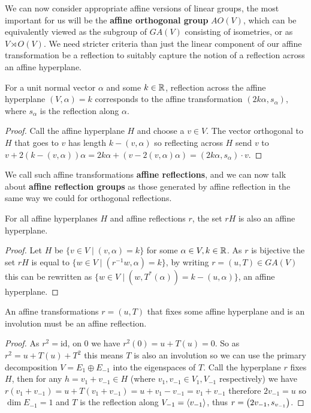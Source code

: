 \documentclass[../main.tex]{subfiles}
\begin{document}
We can now consider appropriate affine versions of linear groups, the most important for us will be the \textbf{affine orthogonal group} $AO(V)$, which can be equivalently viewed as the subgroup of $GA(V)$ consisting of isometries, or as $V\rtimes O(V)$. We need stricter criteria than just the linear component of our affine transformation be a reflection to suitably capture the notion of a reflection across an affine hyperplane.

\begin{proposition}
    For a unit normal vector $\alpha$ and some $k\in \mathbb{R}$, reflection across the affine hyperplane $(V,\alpha) = k$ corresponds to the affine transformation $(2k\alpha,s_\alpha)$, where $s_\alpha$ is the reflection along $\alpha$.\begin{proof}
        Call the affine hyperplane $H$ and choose a $v\in V$. The vector orthogonal to $H$ that goes to $v$ has length $k-(v,\alpha)$ so reflecting across $H$ send $v$ to $v+2(k-(v,\alpha))\alpha = 2k\alpha + (v-2(v,\alpha)\alpha) = (2k\alpha, s_\alpha)\cdot v$.
    \end{proof}
\end{proposition}

We call such affine transformations \textbf{affine reflections}, and we can now talk about \textbf{affine reflection groups} as those generated by affine reflection in the same way we could for orthogonal reflections.

\begin{lemma}
    For all affine hyperplanes $H$ and affine reflections $r$, the set $rH$ is also an affine hyperplane.
    \begin{proof}
        Let $H$ be $\{v\in V \mid (v,\alpha)=k\}$ for some $\alpha\in V, k\in\mathbb{R}$. As $r$ is bijective the set $rH$ is equal to $\{w\in V \mid (r^{-1}w,\alpha) = k\}$, by writing $r=(u,T)\in GA(V)$ this can be rewritten as $\{w\in V\mid (w,T^*(\alpha))=k-(u,\alpha)\}$, an affine hyperplane.
    \end{proof}
\end{lemma}

\begin{lemma}
    An affine transformations $r=(u,T)$ that fixes some affine hyperplane and is an involution must be an affine reflection.
    \begin{proof}
        As $r^2=\text{id}$, on $0$ we have $r^2(0)=u+T(u)=0$. So as $r^2=u+T(u)+T^2$ this means $T$ is also an involution so we can use the primary decomposition $V=E_1\oplus E_{-1}$ into the eigenspaces of $T$. Call the hyperplane $r$ fixes $H$, then for any $h=v_1+v_{-1}\in H$ (where $v_1,v_{-1}\in V_1,V_{-1}$ respectively) we have $r(v_1+v_{-1}) = u + T(v_1+v_{-1}) = u + v_1 - v_{-1} = v_1 + v_{-1}$ therefore $2v_{-1}=u$ so $\dim E_{-1}=1$ and $T$ is the reflection along $V_{-1}=\left\langle v_{-1} \right\rangle$, thus $r=\left( 2v_{-1},s_{v_{-1}} \right)$.
    \end{proof}
\end{lemma}
\end{document}
